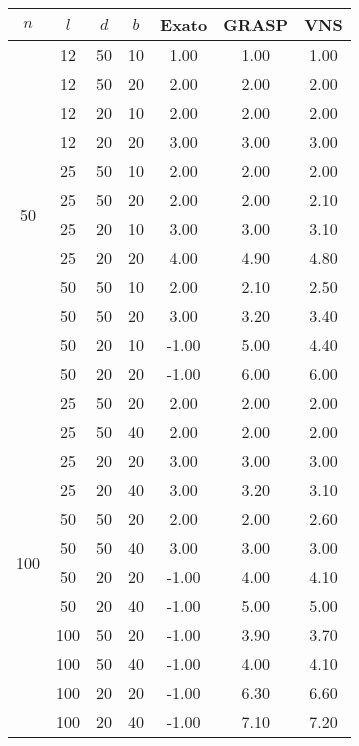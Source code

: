\begin{tabular}{ |c|c|c|c||c c c| }
\hline
$ n $ & $ l $ & $ d $ & $ b $ & Exato & GRASP & VNS \\
\hline
\multirow{12}{*}{50} & 12 & 50 & 10 &   1.00 &   1.00 &   1.00 \\
& 12 & 50 & 20 &   2.00 &   2.00 &   2.00 \\
\cline{3-4}& 12 & 20 & 10 &   2.00 &   2.00 &   2.00 \\
& 12 & 20 & 20 &   3.00 &   3.00 &   3.00 \\
\cline{3-4}\cline{2-2}& 25 & 50 & 10 &   2.00 &   2.00 &   2.00 \\
& 25 & 50 & 20 &   2.00 &   2.00 &   2.10 \\
\cline{3-4}& 25 & 20 & 10 &   3.00 &   3.00 &   3.10 \\
& 25 & 20 & 20 &   4.00 &   4.90 &   4.80 \\
\cline{3-4}\cline{2-2}& 50 & 50 & 10 &   2.00 &   2.10 &   2.50 \\
& 50 & 50 & 20 &   3.00 &   3.20 &   3.40 \\
\cline{3-4}& 50 & 20 & 10 &  -1.00 &   5.00 &   4.40 \\
& 50 & 20 & 20 &  -1.00 &   6.00 &   6.00 \\
\cline{3-4}\cline{2-2}\cline{1-1}\multirow{12}{*}{100} & 25 & 50 & 20 &   2.00 &   2.00 &   2.00 \\
& 25 & 50 & 40 &   2.00 &   2.00 &   2.00 \\
\cline{3-4}& 25 & 20 & 20 &   3.00 &   3.00 &   3.00 \\
& 25 & 20 & 40 &   3.00 &   3.20 &   3.10 \\
\cline{3-4}\cline{2-2}& 50 & 50 & 20 &   2.00 &   2.00 &   2.60 \\
& 50 & 50 & 40 &   3.00 &   3.00 &   3.00 \\
\cline{3-4}& 50 & 20 & 20 &  -1.00 &   4.00 &   4.10 \\
& 50 & 20 & 40 &  -1.00 &   5.00 &   5.00 \\
\cline{3-4}\cline{2-2}& 100 & 50 & 20 &  -1.00 &   3.90 &   3.70 \\
& 100 & 50 & 40 &  -1.00 &   4.00 &   4.10 \\
\cline{3-4}& 100 & 20 & 20 &  -1.00 &   6.30 &   6.60 \\
& 100 & 20 & 40 &  -1.00 &   7.10 &   7.20 \\
\cline{3-4}\cline{2-2}\cline{1-1}\hline
\end{tabular}
